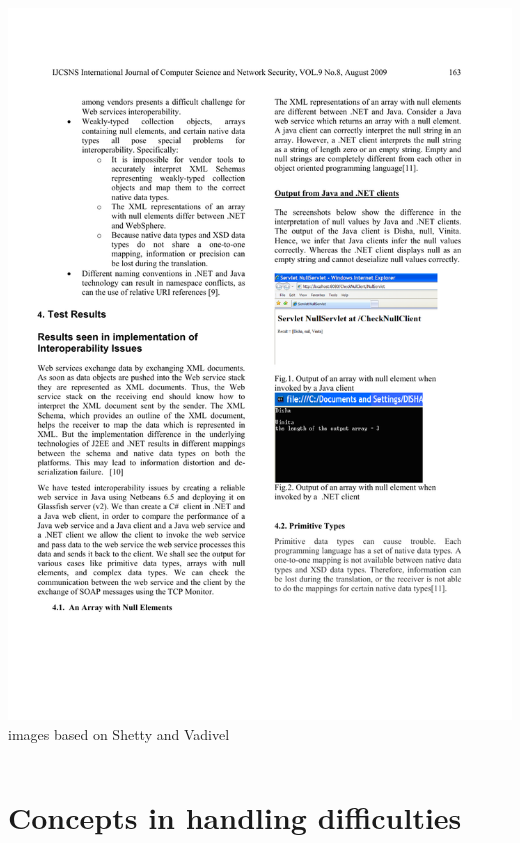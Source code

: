 \documentclass{beamer}
\begin{document}
\begin{frame}
\begin{columns}
\begin{column}{0.5\textwidth}
  \includegraphics[scale=0.9]{graphics/NETNullSmall.pdf}
  \\ \tiny{images based on Shetty and Vadivel\cite{Shetty:2009}}
  \end{column}
  \end{columns}
\end{frame}



\section[Concepts]{Concepts in handling difficulties}
\end{document}

